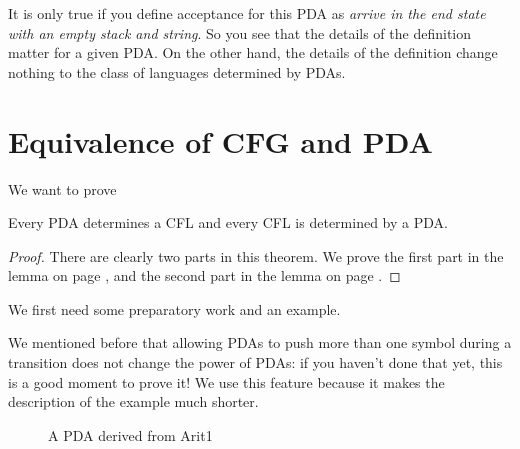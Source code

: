 It is only true if you define acceptance for this PDA as {\em arrive
  in the end state with an empty stack and string}. So you see that
the details of the definition matter for a given PDA. On the other
hand, the details of the definition change nothing to the class of
languages determined by PDAs.



\section{Equivalence of CFG and PDA}

We want to prove

\begin{theorem}
Every PDA determines a CFL and every CFL is determined by a PDA.
\end{theorem}
\begin{proof}
There are clearly two parts in this theorem. We prove the first part
in the lemma on page \pageref{equicfgpda1}, and the second part in the lemma on page \pageref{equicfgpda2}.
\end{proof}

We first need some preparatory work and an example.

We mentioned before that allowing PDAs to push more than one symbol
during a transition does not change the power of PDAs: if you haven't
done that yet, this is a good moment to prove it! We use this feature
because it makes the description of the example much shorter.



\begin{figure}[h]
\caption{A PDA derived from Arit1\label{pda3}}
\end{figure}


